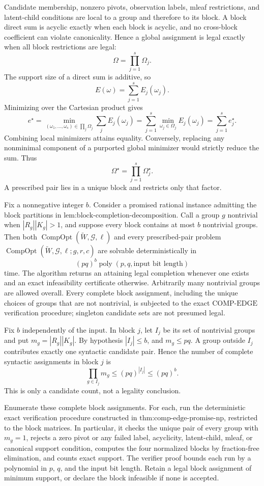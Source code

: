 Candidate membership, nonzero pivots, observation labels, mleaf restrictions, and latent-child conditions are local to a group and therefore to its block. A block direct sum is acyclic exactly when each block is acyclic, and no cross-block coefficient can violate canonicality. Hence a global assignment is legal exactly when all block restrictions are legal:
\[
\Omega=\prod_{j=1}^{s}\Omega_j.
\]
The support size of a direct sum is additive, so
\[
E(\omega)=\sum_{j=1}^{s}E_j(\omega_j).
\]
Minimizing over the Cartesian product gives
\[
e^\star
=\min_{(\omega_1,\ldots,\omega_s)\in\prod_j\Omega_j}\sum_jE_j(\omega_j)
=\sum_{j=1}^{s}\min_{\omega_j\in\Omega_j}E_j(\omega_j)
=\sum_{j=1}^{s}e_j^\star.
\]
Combining local minimizers attains equality. Conversely, replacing any nonminimal component of a purported global minimizer would strictly reduce the sum. Thus
\[
\Omega^\star=\prod_{j=1}^{s}\Omega_j^\star.
\]
A prescribed pair lies in a unique block and restricts only that factor.

Fix a nonnegative integer \(b\). Consider a promised rational instance admitting the block partitions in \(\text{lem:block-completion-decomposition}\). Call a group \(g\) nontrivial when \(|R_g||K_g|>1\), and suppose every block contains at most \(b\) nontrivial groups. Then both \(\operatorname{CompOpt}(\widetilde W,\mathcal G,\ell)\) and every prescribed-pair problem \(\operatorname{CompOpt}(\widetilde W,\mathcal G,\ell;g,r,c)\) are solvable deterministically in
\[
(pq)^b\operatorname{poly}(p,q,\text{input bit length})
\]
time. The algorithm returns an attaining legal completion whenever one exists and an exact infeasibility certificate otherwise. Arbitrarily many nontrivial groups are allowed overall. Every complete block assignment, including the unique choices of groups that are not nontrivial, is subjected to the exact \(\mathrm{COMP\text{-}EDGE}\) verification procedure; singleton candidate sets are not presumed legal.

Fix \(b\) independently of the input. In block \(j\), let \(I_j\) be its set of nontrivial groups and put \(m_g=|R_g||K_g|\). By hypothesis \(|I_j|\le b\), and \(m_g\le pq\). A group outside \(I_j\) contributes exactly one syntactic candidate pair. Hence the number of complete syntactic assignments in block \(j\) is
\[
\prod_{g\in I_j}m_g\le(pq)^{|I_j|}\le(pq)^b.
\]
This is only a candidate count, not a legality conclusion.

Enumerate these complete block assignments. For each, run the deterministic exact verification procedure constructed in \(\text{thm:comp-edge-promise-np}\), restricted to the block matrices. In particular, it checks the unique pair of every group with \(m_g=1\), rejects a zero pivot or any failed label, acyclicity, latent-child, mleaf, or canonical support condition, computes the four normalized blocks by fraction-free elimination, and counts exact support. The verifier proof bounds each run by a polynomial in \(p\), \(q\), and the input bit length. Retain a legal block assignment of minimum support, or declare the block infeasible if none is accepted.

